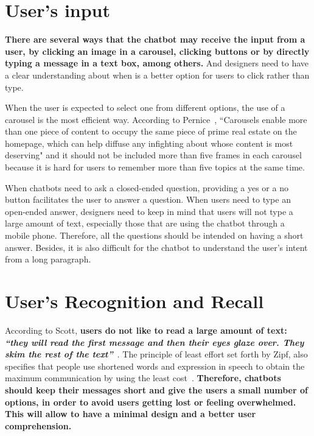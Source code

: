 \documentclass[a4paper,10pt]{article}
\begin{document}
\section{User's input}

\textbf{There are several ways that the chatbot may receive the input from a user, by clicking an image in a carousel, clicking buttons or by directly typing a message in a text box, among others.} And designers need to have a clear understanding about when is a better option for users to click rather than type. 


When the user is expected to select one from different options, the use of a carousel is the most efficient way. According to Pernice~\cite{carousel}, ``Carousels enable more than one piece of content to occupy the same piece of prime real estate on the homepage, which can help diffuse any infighting about whose content is most deserving" and it should not be included more than five frames in each carousel because it is hard for users to remember more than five topics at the same time.

When chatbots need to ask a closed-ended question, providing a yes or a no button facilitates the user to answer a question. When users need to type an open-ended answer, designers need to keep in mind that users will not type a large amount of text, especially those that are using the chatbot through a mobile phone. Therefore, all the questions should be intended on having a short answer. Besides, it is also difficult for the chatbot to understand the user's intent from a long paragraph. 

 
\section{User's Recognition and Recall}

According to Scott, \textbf{users do not like to read a large amount of text: \textit{``they will read the first message and then their eyes glaze over. They skim the rest of the text”}}~\cite{HeuristicsWebPage}. The principle of least effort set forth by Zipf, also specifies that people use shortened words and expression in speech to obtain the maximum communication by using the least cost~\cite{zipf2016human}. \textbf{Therefore, chatbots should keep their messages short and give the users a small number of options, in order to avoid users getting lost or feeling overwhelmed. This will allow to have a minimal design and a better user comprehension.}
\end{document}
